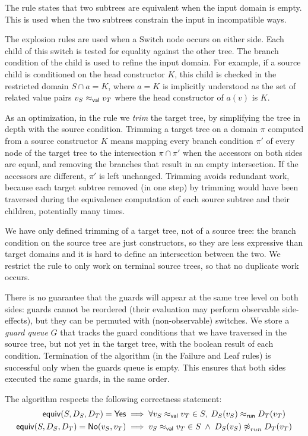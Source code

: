 \documentclass[12pt]{article}
\newcommand{\Rule}[1]{\LabTirName{#1}}
\begin{document}
The \Rule{empty} rule states that two subtrees are equivalent when the
input domain is empty. This is used when the two subtrees constrain
the input in incompatible ways.

The explosion rules are used when a \textsf{Switch} node occurs on
either side. Each child of this switch is tested for equality against
the other tree. The branch condition of the child is used to refine
the input domain. For example, if a source child is conditioned on the
head constructor $K$, this child is checked in the restricted domain
$S \cap a = K$, where $a = K$ is implicitly understood as the set of
related value pairs $\vrel {v_S} {v_T}$ where the head constructor of
$a(v)$ is $K$.

As an optimization, in the \Rule{explode-left} rule we \emph{trim} the
target tree, by simplifying the tree in depth with the source
condition. Trimming a target tree on a domain $\pi$ computed from
a source constructor $K$ means mapping every branch condition $\pi'$
of every node of the target tree to the intersection $\pi \cap \pi'$
when the accessors on both sides are equal, and removing the branches
that result in an empty intersection. If the accessors are different,
$\pi'$ is left unchanged.  Trimming avoids redundant work, because
each target subtree removed (in one step) by trimming would have been
traversed during the equivalence computation of each source subtree
and their children, potentially many times.

We have only defined trimming of a target tree, not of a source tree:
the branch condition on the source tree are just constructors, so they
are less expressive than target domains and it is hard to define an
intersection between the two. We restrict the \Rule{explode-right}
rule to only work on terminal source trees, so that no duplicate work
occurs.

There is no guarantee that the guards will appear at the same tree
level on both sides: guards cannot be reordered (their evaluation may
perform observable side-effects), but they can be permuted with
(non-observable) switches. We store a \emph{guard queue} $G$ that
tracks the guard conditions that we have traversed in the source tree,
but not yet in the target tree, with the boolean result of each
condition.
%
Termination of the algorithm (in the \textsf{Failure} and
\textsf{Leaf} rules) is successful only when the guards queue is
empty. This ensures that both sides executed the same guards, in the
same order.

The algorithm respects the following correctness statement:
\begin{align*}
 \SimpleEquiv S {D_S} {D_T} = \Yes
 & \implies
 \forall {\vrel {v_S} {v_T}} \in S,\; \runrel {D_S(v_S)} {D_T(v_T)}
\\
 \SimpleEquiv S {D_S} {D_T} = \No {v_S} {v_T}
 & \implies
 \vrel {v_S} {v_T} \in S \;\land\; {\nparamrel{run} {D_S(v_S)} {D_T(v_T)}}
\end{align*}
\end{document}
